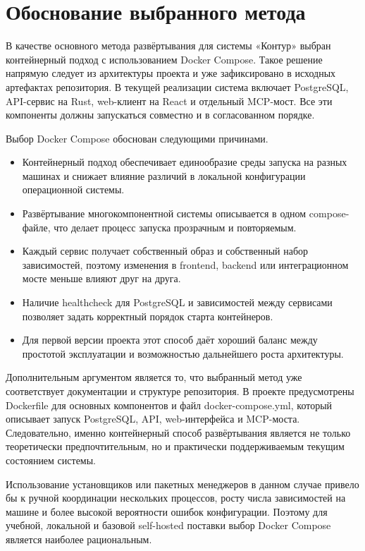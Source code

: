 \section{Обоснование выбранного метода}
\headingtextsep

В качестве основного метода развёртывания для системы «Контур» выбран контейнерный подход с использованием Docker Compose. Такое решение напрямую следует из архитектуры проекта и уже зафиксировано в исходных артефактах репозитория. В текущей реализации система включает PostgreSQL, API-сервис на Rust, web-клиент на React и отдельный MCP-мост. Все эти компоненты должны запускаться совместно и в согласованном порядке.

Выбор Docker Compose обоснован следующими причинами.

\begin{itemize}
\item Контейнерный подход обеспечивает единообразие среды запуска на разных машинах и снижает влияние различий в локальной конфигурации операционной системы.
\item Развёртывание многокомпонентной системы описывается в одном compose-файле, что делает процесс запуска прозрачным и повторяемым.
\item Каждый сервис получает собственный образ и собственный набор зависимостей, поэтому изменения в frontend, backend или интеграционном мосте меньше влияют друг на друга.
\item Наличие healthcheck для PostgreSQL и зависимостей между сервисами позволяет задать корректный порядок старта контейнеров.
\item Для первой версии проекта этот способ даёт хороший баланс между простотой эксплуатации и возможностью дальнейшего роста архитектуры.
\end{itemize}

Дополнительным аргументом является то, что выбранный метод уже соответствует документации и структуре репозитория. В проекте предусмотрены Dockerfile для основных компонентов и файл docker-compose.yml, который описывает запуск PostgreSQL, API, web-интерфейса и MCP-моста. Следовательно, именно контейнерный способ развёртывания является не только теоретически предпочтительным, но и практически поддерживаемым текущим состоянием системы.

Использование установщиков или пакетных менеджеров в данном случае привело бы к ручной координации нескольких процессов, росту числа зависимостей на машине и более высокой вероятности ошибок конфигурации. Поэтому для учебной, локальной и базовой self-hosted поставки выбор Docker Compose является наиболее рациональным.
